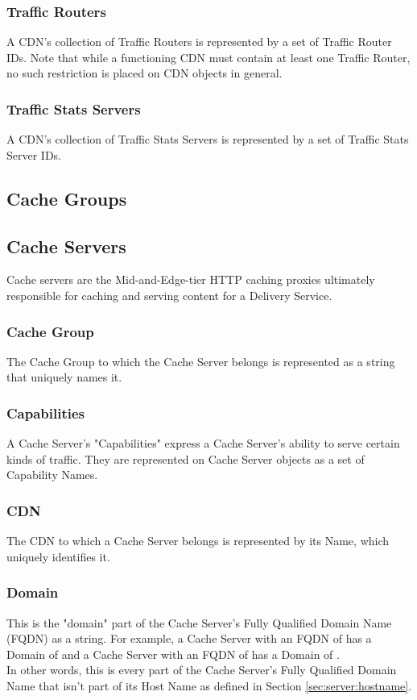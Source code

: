 \subsubsection{Traffic Routers}
A CDN's collection of Traffic Routers is represented by a set of Traffic Router
IDs. Note that while a functioning CDN must contain at least one Traffic Router,
no such restriction is placed on CDN objects in general.

\subsubsection{Traffic Stats Servers}
A CDN's collection of Traffic Stats Servers is represented by a set of Traffic
Stats Server IDs.



\subsection{Cache Groups}



\subsection{Cache Servers}
Cache servers are the Mid-and-Edge-tier HTTP caching proxies ultimately
responsible for caching and serving content for a Delivery Service.

\subsubsection{Cache Group}
The Cache Group to which the Cache Server belongs is represented as a string
that uniquely names it.

\subsubsection{Capabilities}
A Cache Server's "Capabilities" express a Cache Server's ability to serve
certain kinds of traffic. They are represented on Cache Server objects as a set
of Capability Names.

\subsubsection{CDN}
The CDN to which a Cache Server belongs is represented by its Name, which
uniquely identifies it.

\subsubsection{Domain\label{sec:server:domain}}
This is the "domain" part of the Cache Server's Fully Qualified Domain Name
(FQDN) as a string. For example, a Cache Server with an FQDN of
 has a Domain of  and a Cache Server with an FQDN of
 has a Domain of .\\
In other words, this is every part of the Cache Server's Fully Qualified Domain
Name that isn't part of its Host Name as defined in Section
\ref{sec:server:hostname}.

